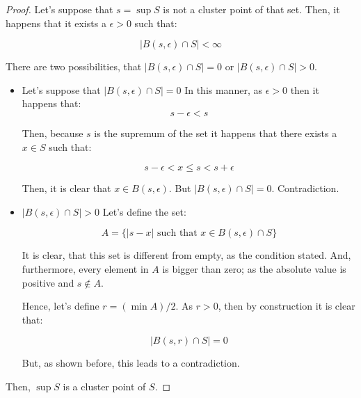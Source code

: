 \documentclass[11pt]{article}
\theoremstyle{definition}
\theoremstyle{remark}
\theoremstyle{remark}
\begin{document}
\begin{proof}
  Let's suppose that $s = \sup S$ is not a cluster point of that
  set. Then, it happens that it exists a $\epsilon > 0$ such that:

  \begin{equation}
    |B(s, \epsilon) \cap S| < \infty
  \end{equation}

  There are two possibilities, that $|B(s, \epsilon) \cap S| = 0$ or
  $|B(s, \epsilon) \cap S| > 0$.

  \begin{itemize}
  \item Let's suppose that $|B(s, \epsilon) \cap S| = 0$
    In this manner, as $\epsilon > 0$ then it happens that:
    \begin{equation}
      s - \epsilon < s
    \end{equation}

    Then, because $s$ is the supremum of the set it happens that
    there exists a $x \in S$ such that:

    \begin{equation}
      s - \epsilon < x \le s < s + \epsilon
    \end{equation}

    Then, it is clear that $x \in B(s, \epsilon)$. But
    $|B(s, \epsilon) \cap S| = 0$. Contradiction.

  \item $|B(s, \epsilon) \cap S| > 0$
    Let's define the set:

    \begin{equation}
      A = \{|s - x| \text{ such that } x \in B(s, \epsilon) \cap S\}
    \end{equation}

    It is clear, that this set is different from empty, as the
    condition stated. And, furthermore, every element in $A$ is
    bigger than zero; as the absolute value is positive and
    $s \notin A$.

    Hence, let's define $r = (\min A)/2$. As $r > 0$, then by construction it is clear that:

    \begin{equation}
      |B(s, r) \cap S| = 0
    \end{equation}

    But, as shown before, this leads to a contradiction.
  \end{itemize}

  Then, $\sup S$ is a cluster point of $S$.
\end{proof}
\end{document}
